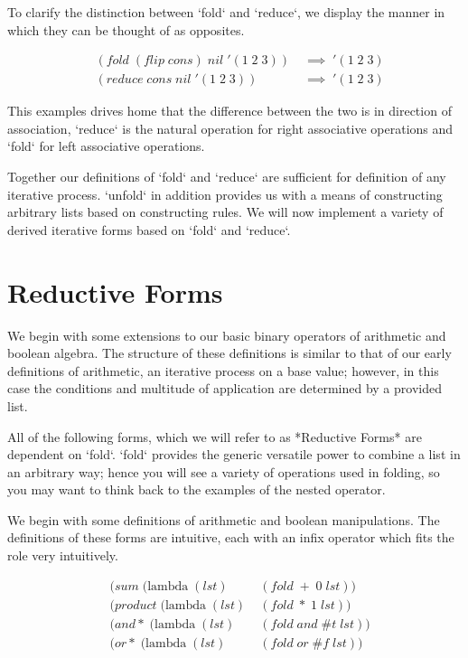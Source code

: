 To clarify the distinction between `fold` and `reduce`, we display the manner in 
which they can be thought of as opposites.

\begin{align*}
& (fold \; (flip \; cons) \; nil \; '(1 \; 2 \; 3)) \; &\implies \; '(1 \; 2 \; 3)
\\& (reduce \; cons \; nil \; '(1 \; 2 \; 3)) \; &\implies \; '(1 \; 2 \; 3)
\end{align*}

This examples drives home that the difference between the two is in direction of 
association, `reduce` is the natural operation for right associative operations 
and `fold` for left associative operations.

Together our definitions of `fold` and `reduce` are sufficient for definition of 
any iterative process. `unfold` in addition provides us with a means of 
constructing arbitrary lists based on constructing rules. We will now implement a 
variety of derived iterative forms based on `fold` and `reduce`.

\section{Reductive Forms}
We begin with some extensions to our basic binary operators of arithmetic and 
boolean algebra. The structure of these definitions is similar to that of our 
early definitions of arithmetic, an iterative process on a base value; however, in 
this case the conditions and multitude of application are determined by a provided 
list.

All of the following forms, which we will refer to as *Reductive Forms* are 
dependent on `fold`. `fold` provides the generic versatile power to combine a list 
in an arbitrary way; hence you will see a variety of operations used in folding, 
so you may want to think back to the examples of the nested operator.

We begin with some definitions of arithmetic and boolean manipulations. The 
definitions of these forms are intuitive, each with an infix operator which fits 
the role very intuitively.

\begin{align*}
& (sum \; (\text{lambda} \; (lst) \; &(fold \; + \; 0 \; lst))
\\& (product \; (\text{lambda} \; (lst) \; &(fold \; * \; 1 \; lst))
\\& (and* \; (\text{lambda} \; (lst) \; &(fold \; and \; \#t \; lst))
\\& (or* \; (\text{lambda} \; (lst) \; &(fold \; or \; \#f \; lst))
\end{align*}

